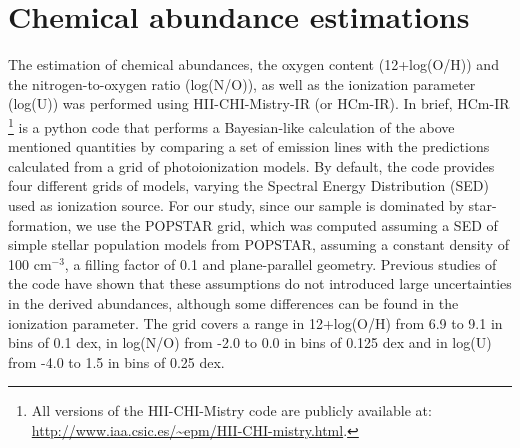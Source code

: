 \documentclass{nature2}
\newcounter{daggerfootnote}
\newcommand*{\daggerfootnote}[1]{%
	\setcounter{daggerfootnote}{\value{footnote}}%
	\renewcommand*{\thefootnote}{\fnsymbol{footnote}}%
	\footnote[2]{#1}%
	\setcounter{footnote}{\value{daggerfootnote}}%
	\renewcommand*{\thefootnote}{\arabic{footnote}}%
}
\begin{document}
\section{Chemical abundance estimations}
\label{sec:chemical}
The estimation of chemical abundances, the oxygen content (12+log(O/H)) and the nitrogen-to-oxygen ratio (log(N/O)), as well as the ionization parameter (log(U)) was performed using {\sc HII-CHI-Mistry-IR}\cite{FO21,PD22} (or {\sc HCm-IR}). In brief, {\sc HCm-IR}\daggerfootnote{All versions of the {\sc HII-CHI-Mistry} code are publicly available at: \url{http://www.iaa.csic.es/~epm/HII-CHI-mistry.html}.} is a python code that performs a Bayesian-like calculation of the above mentioned quantities by comparing a set of emission lines with the predictions calculated from a grid of photoionization models\cite{PM14}. By default, the code provides four different grids of models, varying the Spectral Energy Distribution (SED) used as ionization source. For our study, since our sample is dominated by star-formation, we use the {\sc POPSTAR} grid, which was computed assuming a SED of simple stellar population models from {\sc POPSTAR}\cite{Molla_2009}, assuming a constant density of 100 cm$^{-3}$, a filling factor of 0.1 and plane-parallel geometry. Previous studies of the code have shown that these assumptions do not introduced large uncertainties in the derived abundances, although some differences can be found in the ionization parameter\cite{PM14, PM17, PM19, PD21, PD22, PM23}. The grid covers a range in 12+log(O/H) from 6.9 to 9.1 in bins of 0.1 dex, in log(N/O) from -2.0 to 0.0 in bins of 0.125 dex and in log(U) from -4.0 to 1.5 in bins of 0.25 dex.
\end{document}
